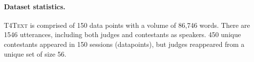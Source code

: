 \paragraph{Dataset statistics.} \textsc{T4Text} is comprised of 150 data points with a volume of 86,746 words. There are 1546 utterances, including both judges and contestants as speakers. 450 unique contestants appeared in 150 sessions (datapoints), but judges reappeared from a unique set of size 56.




